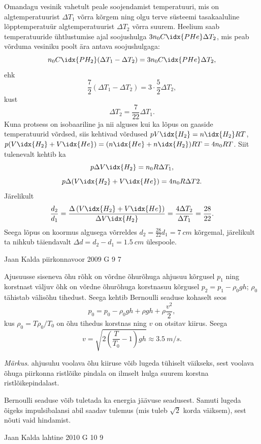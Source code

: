 \documentclass[11pt, twoside]{article}
\begin{document}
{{Omandagu vesinik vahetult peale soojendamist temperatuuri, mis on algtemperatuurist $\Delta T_1$ võrra kõrgem ning olgu terve süsteemi tasakaaluline lõpptemperatuür algtemperatuurist $\Delta T_2$ võrra suurem. Heelium saab temperatuuride ühtlustumise ajal soojushulga $3n_0C\idx{PHe}\Delta T_2$, mis peab võrduma vesiniku poolt ära antava soojushulgaga:
\[
n_0C\idx{PH_2} (\Delta T_1 - \Delta T_2) = 3n_0C\idx{PHe}\Delta T_2,
\]
ehk
\[
\frac{7}{2} (\Delta T_1 - \Delta T_2) = 3 \cdot \frac{5}{2} \Delta T_2,
\]
kust
\[
\Delta T_2 = \frac{7}{22} \Delta T_1.
\]
Kuna protsess on isobaariline ja nii alguses kui ka lõpus on gaaside temperatuurid võrdsed, siis kehtivad võrdused $pV\idx{H_2} = n\idx{H_2}RT$, $p(V\idx{H_2} + V\idx{He}) = (n\idx{He} + n\idx{H_2} )RT = 4n_0RT$. Siit tulenevalt kehtib ka
\[
p\Delta V\idx{H_2} = n_0R\Delta T_1,
\]
\[
p\Delta (V\idx{H_2} + V\idx{He}) = 4n_0R\Delta T2.
\]
Järelikult
\[
\frac{d_{2}}{d_{1}}=\frac{\Delta\left(V\idx{H_{2}}+V\idx{H e}\right)}{\Delta V\idx{H_{2}}}=\frac{4 \Delta T_{2}}{\Delta T_{1}}=\frac{28}{22}.
\]
Seega lõpus on koormus algusega võrreldes $d_2 = \frac{28}{22} d_1 = \SI{7}{cm}$ kõrgemal, järelikult ta nihkub täiendavalt $\Delta d = d_2 - d_1 = \SI{1,5}{cm}$ ülespoole. 
\fi
}

{Jaan Kalda} %
{piirkonnavoor} %
{2009} %
{G 9} %
{7} %
{

\ifSolution
Ajusuusse siseneva õhu rõhk on võrdne õhurõhuga ahjusuu kõrgusel $p_1$ ning korstnast väljuv õhk on võrdne õhurõhuga korstnasuu kõrgusel $p_2=p_1-\rho_0 gh$;
$\rho_0$ tähistab välisõhu tihedust. Seega kehtib Bernoulli seaduse kohaselt seos 
\[
p_0=p_0-\rho_0 gh +\rho gh+\rho \frac{v^2}{2},
\]
kus $\rho_0=T\rho_0/T_0$ on õhu tihedus korstnas ning $v$ on otsitav kiirus. Seega
\[
v=\sqrt {2(\frac T{T_0}-1)gh}\approx \SI{3,5}{m/s}.
\]

\emph{Märkus}. ahjusuhu voolava õhu kiiruse võib lugeda tühiselt väikseks, sest voolava õhuga piirkonna ristlõike pindala on ilmselt hulga suurem korstna ristlõikepindalast.


Bernoulli seaduse võib tuletada ka energia jäävuse seadusest. Samuti lugeda õigeks impulsibalansi abil saadav tulemus (mis tuleb $\sqrt 2$ korda väiksem), sest nõuti vaid hindamist.
\fi
}

{Jaan Kalda} %
{lahtine} %
{2010} %
{G 10} %
{9} %
{

}}
\end{document}
